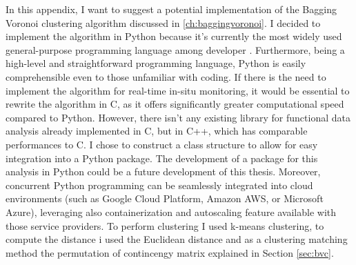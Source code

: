 In this appendix, I want to suggest a potential implementation of the Bagging Voronoi clustering algorithm discussed in \ref{ch:baggingvoronoi}. I decided to implement the algorithm in Python because it's currently the most widely used general-purpose programming language among developer \cite{lionel_sujay_vailshery_most_2023}. Furthermore, being a high-level and straightforward programming language, Python is easily comprehensible even to those unfamiliar with coding. If there is the need to implement the algorithm for real-time in-situ monitoring, it would be essential to rewrite the algorithm in C, as it offers significantly greater computational speed compared to Python. However, there isn't any existing library for functional data analysis already implemented in C, but in C++, which has comparable performances to C. I chose to construct a class structure to allow for easy integration into a Python package. The development of a package for this analysis in Python could be a future development of this thesis. Moreover, concurrent Python programming can be seamlessly integrated into cloud environments (such as Google Cloud Platform, Amazon AWS, or Microsoft Azure), leveraging also containerization and autoscaling feature available with those service providers. To perform clustering I used k-means clustering, to compute the distance i used the Euclidean distance and as a clustering matching method the permutation of contincengy matrix explained in Section \ref{sec:bvc}.
%